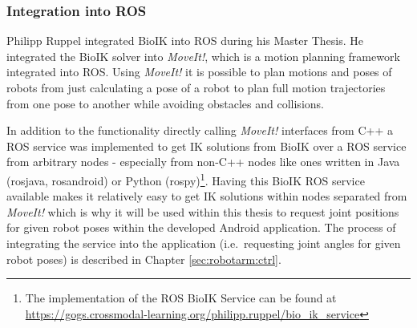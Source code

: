 \subsubsection{Integration into ROS}
Philipp Ruppel integrated BioIK into ROS during his Master Thesis\cite{Ruppel17}. He integrated the BioIK solver into \textit{MoveIt!}, which is a motion planning framework integrated into ROS\cite{Coleman15}. Using \textit{MoveIt!} it is possible to plan motions and poses of robots from just calculating a pose of a robot to plan full motion trajectories from one pose to another while avoiding obstacles and collisions.

In addition to the functionality directly calling \textit{MoveIt!} interfaces from C++ a ROS service was implemented to get IK solutions from BioIK over a ROS service from arbitrary nodes - especially from non-C++ nodes like ones written in Java (rosjava, rosandroid) or Python (rospy)\footnote{The implementation of the ROS BioIK Service can be found at \url{https://gogs.crossmodal-learning.org/philipp.ruppel/bio_ik_service}}. 
Having this BioIK ROS service available makes it relatively easy to get IK solutions within nodes separated from \textit{MoveIt!} which is why it will be used within this thesis to request joint positions for given robot poses within the developed Android application. The process of integrating the service into the application (i.e.~requesting joint angles for given robot poses) is described in Chapter \ref{sec:robotarm:ctrl}.